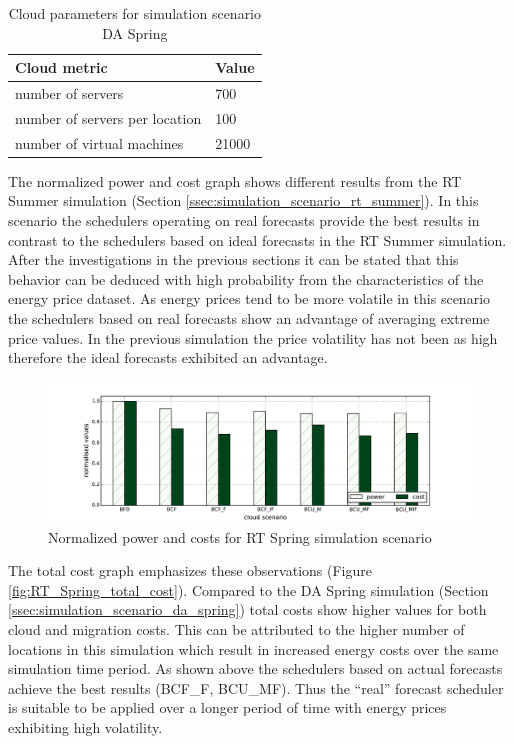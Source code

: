 \begin{table}[htbp]
\centering
\begin{tabular}[\textwidth]{ll}
\toprule
	Cloud metric & Value  \\
\midrule
	number of servers & 700 \\
	number of servers per location & 100 \\
	number of virtual machines & 21000\\
\bottomrule
\end{tabular}
\caption{Cloud parameters for simulation scenario DA Spring}
\label{tab:da_spring_cloud_parameters}
\end{table}

The normalized power and cost graph shows different results from the RT Summer simulation (Section \ref{ssec:simulation_scenario_rt_summer}). In this scenario the schedulers operating on real forecasts provide the best results in contrast to the schedulers based on ideal forecasts in the RT Summer simulation. After the investigations in the previous sections it can be stated that this behavior can be deduced with high probability from the characteristics of the energy price dataset. 
As energy prices tend to be more volatile in this scenario the schedulers based on real forecasts show an advantage of averaging extreme price values. In the previous simulation the price volatility has not been as high therefore the ideal forecasts exhibited an advantage. 


\begin{figure}[htbp]
	\centering
		\includegraphics[width=1.00\textwidth]{figures/evaluation_and_results/RT_Spring_power_vs_cost.pdf}
	\caption{Normalized power and costs for RT Spring simulation scenario}
	\label{fig:RT_Spring_power_vs_cost}
\end{figure}

The total cost graph emphasizes these observations (Figure \ref{fig:RT_Spring_total_cost}). Compared to the DA Spring simulation (Section \ref{ssec:simulation_scenario_da_spring}) total costs show higher values for both cloud and migration costs. This can be attributed to the higher number of locations in this simulation which result in increased energy costs over the same simulation time period. 
As shown above the schedulers based on actual forecasts achieve the best results (BCF\_F, BCU\_MF). Thus the ``real'' forecast scheduler is suitable to be applied over a longer period of time with energy prices exhibiting high volatility. 

